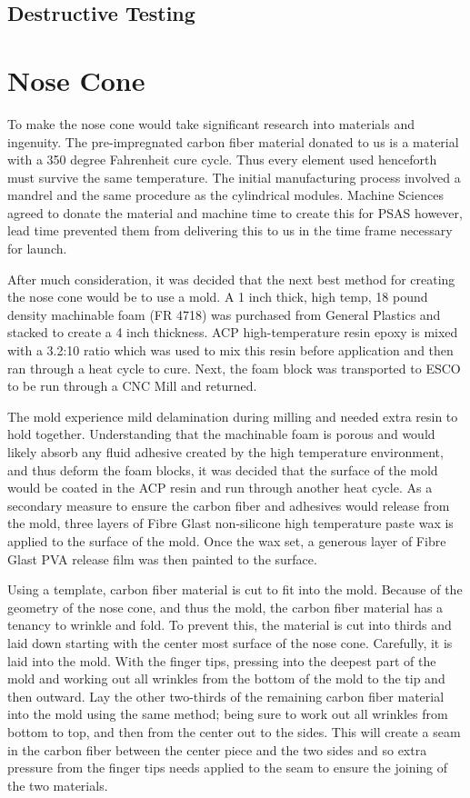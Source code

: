 \documentclass{aiaa-tc}%
\begin{document}
\subsection{Destructive Testing}

\section{Nose Cone}\label{sec:noseCone}
To make the nose cone would take significant research into materials and ingenuity. The pre-impregnated carbon fiber material donated to us is a material with a 350 degree Fahrenheit cure cycle. Thus every element used henceforth must survive the same temperature. The initial manufacturing process involved a mandrel and the same procedure as the cylindrical modules. Machine Sciences agreed to donate the material and machine time to create this for PSAS however, lead time prevented them from delivering this to us in the time frame necessary for launch. 

After much consideration, it was decided that the next best method for creating the nose cone would be to use a mold. A 1 inch thick, high temp, 18 pound 
density machinable foam (FR 4718) was purchased from General Plastics and stacked to create a 4 inch thickness. ACP high-temperature resin epoxy is mixed with a 3.2:10 ratio which was used to mix this resin before application and then ran through a heat cycle to cure. Next, the foam block was transported to ESCO to be run through a CNC Mill and returned. 

The mold experience mild delamination during milling and needed extra resin to hold together. Understanding that the machinable foam is porous and would likely absorb any fluid adhesive created by the high temperature environment, and thus deform the foam blocks, it was decided that the surface of the mold would be coated in the ACP resin and run through another heat cycle. As a secondary measure to ensure the carbon fiber and adhesives would release from the mold, three layers of Fibre Glast non-silicone high temperature paste wax is applied to the surface of the mold. Once the wax set, a generous layer of Fibre Glast PVA release film was then painted to the surface. 

Using a template, carbon fiber material is cut to fit into the mold. Because of the geometry of the nose cone, and thus the mold, the carbon fiber material has a tenancy to wrinkle and fold. To prevent this, the material is cut into thirds and laid down starting with the center most surface of the nose cone. Carefully, it is laid into the mold. With the finger tips, pressing into the deepest part of the mold and working out all wrinkles from the bottom of the mold to the tip and then outward. Lay the other two-thirds of the remaining carbon fiber material into the mold using the same method; being sure to work out all wrinkles from bottom to top, and then from the center out to the sides. This will create a seam in the carbon fiber between the center piece and the two sides and so extra pressure from the finger tips needs applied to the seam to ensure the joining of the two materials.
\end{document}

